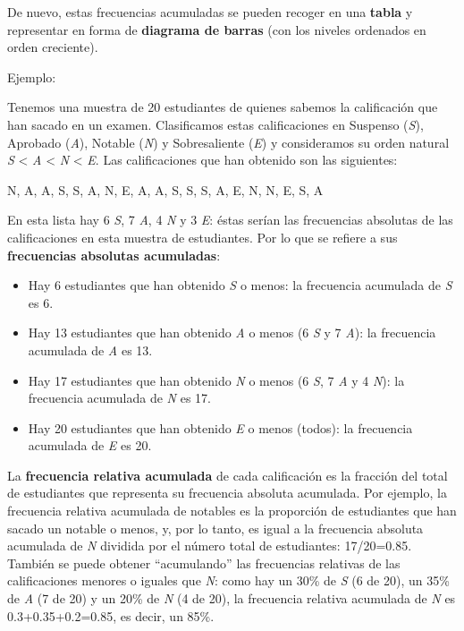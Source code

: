 \documentclass[
  spanish,
  letterpaper,
  DIV=11,
  numbers=noendperiod]{scrreprt}
\newenvironment{Shaded}{\begin{snugshade}}{\end{snugshade}}
\newcommand{\NormalTok}[1]{\textcolor[rgb]{0.00,0.23,0.31}{#1}}
\providecommand{\tightlist}{%
  \setlength{\itemsep}{0pt}\setlength{\parskip}{0pt}}
\begin{document}
De nuevo, estas frecuencias acumuladas se pueden recoger en una
\textbf{tabla} y representar en forma de \textbf{diagrama de barras}
(con los niveles ordenados en orden creciente).

Ejemplo:

Tenemos una muestra de 20 estudiantes de quienes sabemos la calificación
que han sacado en un examen. Clasificamos estas calificaciones en
Suspenso (\emph{S}), Aprobado (\emph{A}), Notable (\emph{N}) y
Sobresaliente (\emph{E}) y consideramos su orden natural \emph{S}
\textless{} \emph{A} \textless{} \emph{N} \textless{} \emph{E}. Las
calificaciones que han obtenido son las siguientes:

\begin{Shaded}
\begin{Highlighting}[]
\NormalTok{N, A, A, S, S, A, N, E, A, A, S, S, S, A, E, N, N, E, S, A}
\end{Highlighting}
\end{Shaded}

En esta lista hay 6 \emph{S}, 7 \emph{A}, 4 \emph{N} y 3 \emph{E}: éstas
serían las frecuencias absolutas de las calificaciones en esta muestra
de estudiantes. Por lo que se refiere a sus \textbf{frecuencias
absolutas acumuladas}:

\begin{itemize}
\tightlist
\item
  Hay 6 estudiantes que han obtenido \emph{S} o menos: la frecuencia
  acumulada de \emph{S} es 6.
\item
  Hay 13 estudiantes que han obtenido \emph{A} o menos (6 \emph{S} y 7
  \emph{A}): la frecuencia acumulada de \emph{A} es 13.
\item
  Hay 17 estudiantes que han obtenido \emph{N} o menos (6 \emph{S}, 7
  \emph{A} y 4 \emph{N}): la frecuencia acumulada de \emph{N} es 17.
\item
  Hay 20 estudiantes que han obtenido \emph{E} o menos (todos): la
  frecuencia acumulada de \emph{E} es 20.
\end{itemize}

La \textbf{frecuencia relativa acumulada} de cada calificación es la
fracción del total de estudiantes que representa su frecuencia absoluta
acumulada. Por ejemplo, la frecuencia relativa acumulada de notables es
la proporción de estudiantes que han sacado un notable o menos, y, por
lo tanto, es igual a la frecuencia absoluta acumulada de \emph{N}
dividida por el número total de estudiantes: 17/20=0.85. También se
puede obtener ``acumulando'' las frecuencias relativas de las
calificaciones menores o iguales que \emph{N}: como hay un 30\% de
\emph{S} (6 de 20), un 35\% de \emph{A} (7 de 20) y un 20\% de \emph{N}
(4 de 20), la frecuencia relativa acumulada de \emph{N} es
0.3+0.35+0.2=0.85, es decir, un 85\%.
\end{document}
